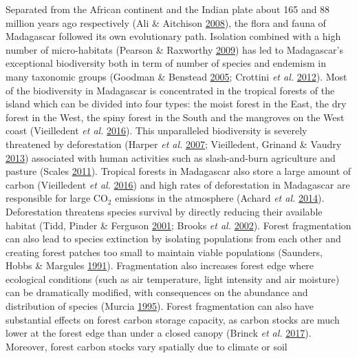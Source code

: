 \documentclass[]{article}
\theoremstyle{definition}
\theoremstyle{definition}
\theoremstyle{definition}
\theoremstyle{remark}
\begin{document}
Separated from the African continent and the Indian plate about 165 and
88 million years ago respectively (Ali \& Aitchison
\protect\hyperlink{ref-Ali2008}{2008}), the flora and fauna of
Madagascar followed its own evolutionary path. Isolation combined with a
high number of micro-habitats (Pearson \& Raxworthy
\protect\hyperlink{ref-Pearson2009}{2009}) has led to Madagascar's
exceptional biodiversity both in term of number of species and endemism
in many taxonomic groups (Goodman \& Benstead
\protect\hyperlink{ref-Goodman2005}{2005}; Crottini \emph{et al.}
\protect\hyperlink{ref-Crottini2012}{2012}). Most of the biodiversity in
Madagascar is concentrated in the tropical forests of the island which
can be divided into four types: the moist forest in the East, the dry
forest in the West, the spiny forest in the South and the mangroves on
the West coast (Vieilledent \emph{et al.}
\protect\hyperlink{ref-Vieilledent2016}{2016}). This unparalleled
biodiversity is severely threatened by deforestation (Harper \emph{et
al.} \protect\hyperlink{ref-Harper2007}{2007}; Vieilledent, Grinand \&
Vaudry \protect\hyperlink{ref-Vieilledent2013}{2013}) associated with
human activities such as slash-and-burn agriculture and pasture (Scales
\protect\hyperlink{ref-Scales2011}{2011}). Tropical forests in
Madagascar also store a large amount of carbon (Vieilledent \emph{et
al.} \protect\hyperlink{ref-Vieilledent2016}{2016}) and high rates of
deforestation in Madagascar are responsible for large CO\(_2\) emissions
in the atmosphere (Achard \emph{et al.}
\protect\hyperlink{ref-Achard2014}{2014}). Deforestation threatens
species survival by directly reducing their available habitat (Tidd,
Pinder \& Ferguson \protect\hyperlink{ref-Tidd2001}{2001}; Brooks
\emph{et al.} \protect\hyperlink{ref-Brooks2002}{2002}). Forest
fragmentation can also lead to species extinction by isolating
populations from each other and creating forest patches too small to
maintain viable populations (Saunders, Hobbs \& Margules
\protect\hyperlink{ref-Saunders1991}{1991}). Fragmentation also
increases forest edge where ecological conditions (such as air
temperature, light intensity and air moisture) can be dramatically
modified, with consequences on the abundance and distribution of species
(Murcia \protect\hyperlink{ref-Murcia1995}{1995}). Forest fragmentation
can also have substantial effects on forest carbon storage capacity, as
carbon stocks are much lower at the forest edge than under a closed
canopy (Brinck \emph{et al.} \protect\hyperlink{ref-Brinck2017}{2017}).
Moreover, forest carbon stocks vary spatially due to climate or soil
\end{document}
